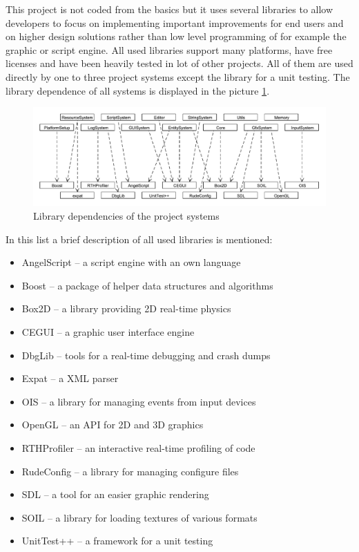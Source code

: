 \documentclass[a4paper, 12pt]{report}
\begin{document}
This project is not coded from the basics but it uses several libraries to allow developers to focus on implementing important improvements for end users and on higher design solutions rather than low level programming of for example the graphic or script engine. All used libraries support many platforms, have free licenses and have been heavily tested in lot of other projects. All of them are used directly by one to three project systems except the library for a unit testing. The library dependence of all systems is displayed in the picture \ref{fig:library-dependence}.

\begin{figure}[htbp]
	\centering
		\includegraphics[width=1\textwidth]{LibraryDependence.pdf}
	\caption{Library dependencies of the project systems}
	\label{fig:library-dependence}
\end{figure}

In this list a brief description of all used libraries is mentioned:

\begin{itemize}
  \item AngelScript -- a script engine with an own language
  \item Boost -- a package of helper data structures and algorithms
  \item Box2D -- a library providing 2D real-time physics
  \item CEGUI -- a graphic user interface engine
  \item DbgLib -- tools for a real-time debugging and crash dumps
  \item Expat -- a XML parser
  \item OIS -- a library for managing events from input devices
  \item OpenGL -- an API for 2D and 3D graphics
  \item RTHProfiler -- an interactive real-time profiling of code
  \item RudeConfig -- a library for managing configure files
  \item SDL -- a tool for an easier graphic rendering
  \item SOIL -- a library for loading textures of various formats
  \item UnitTest++ -- a framework for a unit testing
\end{itemize}
\end{document}
